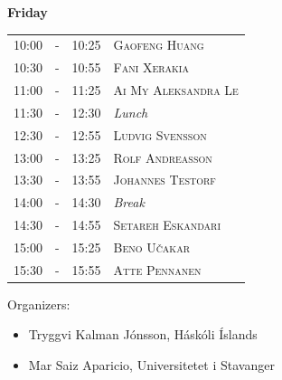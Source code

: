 \documentclass[12pt, openany, twoside]{report}      %
\begin{document}
\bigskip
\noindent
\textbf{\large Friday}
\smallskip

\noindent
\begin{tabular}{l@{ } l@{ } l l}
10:00 & - & 10:25 & \textsc{Gaofeng Huang}
\\
10:30 & - & 10:55 & \textsc{Fani Xerakia}
\\
11:00 & - & 11:25 & \textsc{Ai My Aleksandra Le}
\\
11:30 & - & 12:30 & \textit{Lunch}
\\
12:30 & - & 12:55 & \textsc{Ludvig Svensson}
\\
13:00 & - & 13:25 & \textsc{Rolf Andreasson}
\\
13:30 & - & 13:55 & \textsc{Johannes Testorf}
\\
14:00 & - & 14:30 & \textit{Break}
\\
14:30 & - & 14:55 & \textsc{Setareh Eskandari}
\\
15:00 & - & 15:25 & \textsc{Beno Učakar}
\\
15:30 & - & 15:55 & \textsc{Atte Pennanen}
\end{tabular}




\vfill
\vfill
\noindent
Organizers:
\begin{itemize}
    \setlength\itemsep{-0.3 em}
    \item Tryggvi Kalman Jónsson, Háskóli Íslands
    \item Mar Saiz Aparicio, Universitetet i Stavanger
\end{itemize}
\vfill

\cleardoublepage

\newcommand\talk[3]{%
    \vspace{7 ex}
    \noindent
    \textsc{\large #1}

    \smallskip
    \noindent
    \textbf{\textit{#2}}

    \medskip
    \noindent
    #3

}




\newpage



\newpage



\newpage







\newpage
{}
\end{document}
